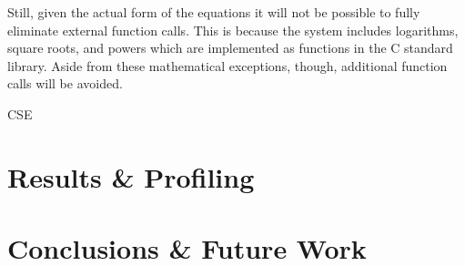 \documentclass[preprint,12pt]{elsarticle}
\begin{document}
Still, given the actual form of the equations it will not be possible to fully 
eliminate external function calls.  This is because the system includes logarithms, 
square roots, and powers which are implemented as functions in the C standard library.
Aside from these mathematical exceptions, though, additional function calls will
be avoided.

CSE



\section{Results \& Profiling}
\label{sec:res}

\section{Conclusions \& Future Work}
\label{sec:conc}


\end{document}
